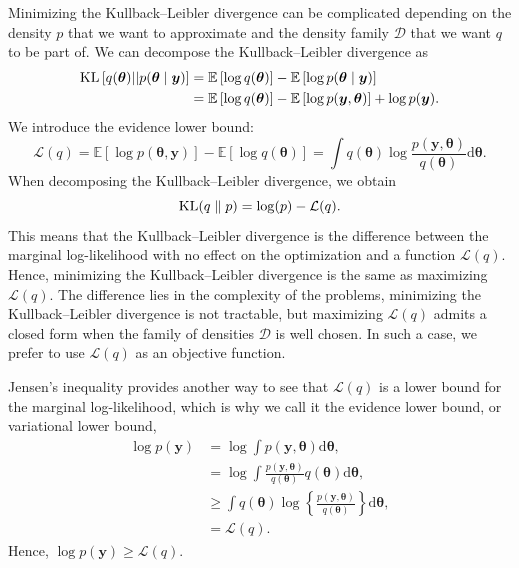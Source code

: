 \documentclass[a4paper, 11pt]{report}
\numberwithin{equation}{chapter}
\DeclareMathOperator*{\KL}{{\rm KL}}
\begin{document}
Minimizing the Kullback--Leibler divergence can be complicated depending on the density $p$ that we want to approximate and the density family $\mathcal{D}$ that we want $q$ to be part of. We can decompose the Kullback--Leibler divergence as
\begin{align*}
\KL\left[q(\boldsymbol{\theta})||p(\boldsymbol{\theta}\mid \boldsymbol{y})\right] &= \mathbb{E}\left[\log q(\boldsymbol{\theta})\right] - \mathbb{E}\left[\log p(\boldsymbol{\theta}\mid \boldsymbol{y})\right]\\
&= \mathbb{E}\left[\log q(\boldsymbol{\theta})\right] - \mathbb{E}\left[\log p(\boldsymbol{y},\boldsymbol{\theta})\right] + \log p(\boldsymbol{y}).
\end{align*}
We introduce the evidence lower bound:
\begin{equation*}
\mathcal{L}(q) = \mathbb{E}\left[\log p(\boldsymbol{\theta},\boldsymbol{y})\right] - \mathbb{E}\left[\log q(\boldsymbol{\theta})\right]
=\int q(\boldsymbol{\theta})\log\frac{p(\boldsymbol{y},\boldsymbol{\theta})}{q(\boldsymbol{\theta})}\mathrm{d}\boldsymbol{\theta}.
\end{equation*}
When decomposing the Kullback--Leibler divergence, we obtain
\begin{equation*}
\KL(q\parallel p) = \log(p) - \mathcal{L}(q).
\end{equation*}
This means that the Kullback--Leibler divergence is the difference between the marginal log-likelihood with no effect on the optimization and a function $\mathcal{L}(q)$. Hence, minimizing the Kullback--Leibler divergence is the same as maximizing $\mathcal{L}(q)$. The difference lies in the complexity of the problems, minimizing the Kullback--Leibler divergence is not tractable, but maximizing $\mathcal{L}(q)$ admits a closed form when the family of densities $\mathcal{D}$ is well chosen. In such a case, we prefer to use $\mathcal{L}(q)$ as an objective function.

Jensen's inequality provides another way to see that $\mathcal{L}(q)$ is a lower bound for the marginal log-likelihood, which is why we call it the evidence lower bound, or variational lower bound,
\begin{align*}
\log p(\boldsymbol{y}) &= \log \int p(\boldsymbol{y}, \boldsymbol{\theta}) \mathrm{d}\boldsymbol{\theta},\\
&= \log \int \frac{p(\boldsymbol{y}, \boldsymbol{\theta})}{q(\boldsymbol{\theta})}q(\boldsymbol{\theta})\mathrm{d}\boldsymbol{\theta}
,\\
&\geq \int q(\boldsymbol{\theta}) \log \left\lbrace \frac{p(\boldsymbol{y}, \boldsymbol{\theta})}{q(\boldsymbol{\theta})} \right\rbrace \mathrm{d}\boldsymbol{\theta},\\
&= \mathcal{L}(q).
\end{align*}
Hence, $\log p(\boldsymbol{y}) \geq \mathcal{L}(q)$.
\end{document}
